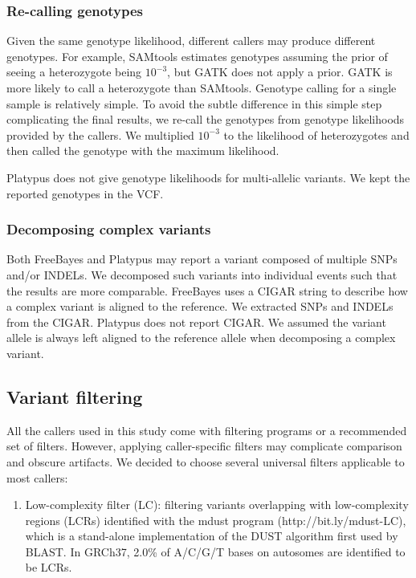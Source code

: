 \documentclass{bioinfo}
\begin{document}
\begin{methods}
\subsubsection{Re-calling genotypes} Given the same genotype likelihood,
different callers may produce different genotypes. For example, SAMtools
estimates genotypes assuming the prior of seeing a heterozygote being $10^{-3}$,
but GATK does not apply a prior. GATK is more likely to call a heterozygote
than SAMtools. Genotype calling for a single sample is relatively simple.
To avoid the subtle difference in this simple step complicating the final
results, we re-call the genotypes from genotype likelihoods provided by the
callers.  We multiplied $10^{-3}$ to the likelihood of heterozygotes and then
called the genotype with the maximum likelihood.

Platypus does not give genotype likelihoods for multi-allelic variants. We
kept the reported genotypes in the VCF.

\subsubsection{Decomposing complex variants} Both FreeBayes and Platypus may
report a variant composed of multiple SNPs and/or INDELs. We decomposed such
variants into individual events such that the results are more comparable.
FreeBayes uses a CIGAR string to describe how a complex variant is aligned to
the reference. We extracted SNPs and INDELs from the CIGAR. Platypus does not
report CIGAR. We assumed the variant allele is always left aligned to the
reference allele when decomposing a complex variant.

\subsection{Variant filtering}\label{sec:flt}

All the callers used in this study come with filtering programs or a recommended
set of filters. However, applying caller-specific filters may complicate
comparison and obscure artifacts. We decided to choose several universal
filters applicable to most callers:

\begin{enumerate}

\item Low-complexity filter (LC): filtering variants overlapping with
low-complexity regions (LCRs) identified with the mdust program
(http://bit.ly/mdust-LC), which is a stand-alone implementation of the DUST
algorithm first used by BLAST. In GRCh37, 2.0\% of A/C/G/T bases on autosomes
are identified to be LCRs.


\end{enumerate}
\end{methods}
\end{document}
